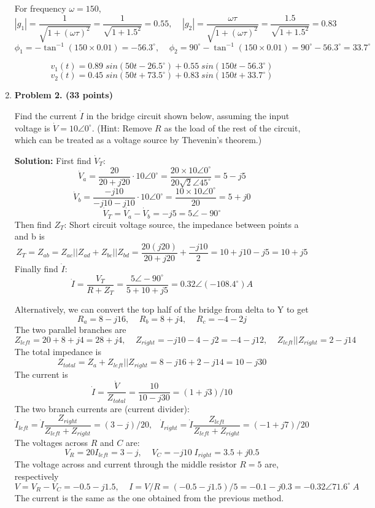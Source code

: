 \begin{enumerate}
For frequency $\omega=150$, 
\[ |g_1|=\frac{1}{\sqrt{1+(\omega \tau)^2}}=\frac{1}{\sqrt{1+1.5^2}}=0.55,\;\;\;\;
|g_2|=\frac{\omega \tau}{\sqrt{1+(\omega \tau)^2}}=\frac{1.5}{\sqrt{1+1.5^2}}=0.83 \]
\[ \phi_1=-\tan^{-1}(150\times 0.01)=-56.3^\circ,\;\;\;\;
   \phi_2=90^\circ-\tan^{-1}(150\times 0.01)=90^\circ-56.3^\circ=33.7^\circ \]

\[ v_1(t)=0.89\; sin(50 t-26.5^\circ)+0.55\;sin(150 t-56.3^\circ) \]
\[ v_2(t)=0.45\; sin(50 t+73.5^\circ)+0.83\;sin(150 t+33.7^\circ) \]


\item {\bf Problem 2. (33 points)} 

Find the current $\dot{I}$ in the bridge circuit shown below, assuming the input
voltage is $\dot{V}=10\angle 0^\circ$. (Hint: Remove $R$ as the load of the rest 
of the circuit, which can be treated as a voltage source by Thevenin's theorem.)


{\bf Solution:}
First find $\dot{V}_T$:
\[	\dot{V}_a=\frac{20}{20+j20}\cdot 10\angle 0^\circ
	=\frac{20\times 10\angle 0^\circ}{20\sqrt{2} \angle 45^\circ}
	=5-j5
\]
\[	\dot{V}_b=\frac{-j10}{-j10-j10}\cdot 10\angle 0^\circ
	=\frac{10\times 10\angle 0^\circ}{20}=5+j0	\]
\[	\dot{V}_T=\dot{V_a}-\dot{V}_b=-j5=5\angle -90^\circ	\]
Then find $Z_T$:
Short circuit voltage source, the impedance between points a and b is
\[ Z_T=Z_{ab}=Z_{ac}||Z_{ad}+Z_{bc}||Z_{bd}=\frac{20(j20)}{20+j20}+\frac{-j10}{2} 
	=10+j10-j5=10+j5 \]
Finally find $\dot{I}$:
\[ \dot{I}=\frac{V_T}{R+Z_T}=\frac{5\angle -90^\circ}{5+10+j5}
	=0.32\angle (-108.4^\circ) A \]

Alternatively, we can convert the top half of the bridge from delta to Y to get
\[   R_a=8-j16,\;\;\;\;R_b=8+j4,\;\;\;\;R_c=-4-2j  \]
The two parallel branches are
\[  Z_{left}=20+8+j4=28+j4,\;\;\;\;Z_{right}=-j10-4-j2=-4-j12,\;\;\;\;
    Z_{left} || Z_{right}=2-j14 \]
The total impedance is
\[ Z_{total}=Z_a+Z_{left} || Z_{right}=8-j16+2-j14=10-j30 \]
The current is
\[ \dot{I}=\frac{\dot{V}}{Z_{total}}=\frac{10}{10-j30}=(1+j3)/10 \]
The two branch currents are (current divider):
\[ \dot{I}_{left}=\dot{I}\frac{Z_{right}}{Z_{left}+Z_{right}}=(3-j)/20,\;\;\;
   \dot{I}_{right}=\dot{I}\frac{Z_{left}}{Z_{left}+Z_{right}}=(-1+j7)/20  \]
The voltages across $R$ and $C$ are:
\[ V_R=20 I_{left}= 3-j,\;\;\;\; V_C=-j10 \; I_{right}=3.5+j0.5 \]
The voltage across and current through the middle resistor $R=5$ are, respectively
\[ V=V_R-V_C=-0.5-j1.5,\;\;\;\;
  I=V/R=(-0.5-j1.5)/5=-0.1-j0.3=-0.32 \angle 71.6^\circ \; A \]
The current is the same as the one obtained from the previous method.



\end{enumerate}
